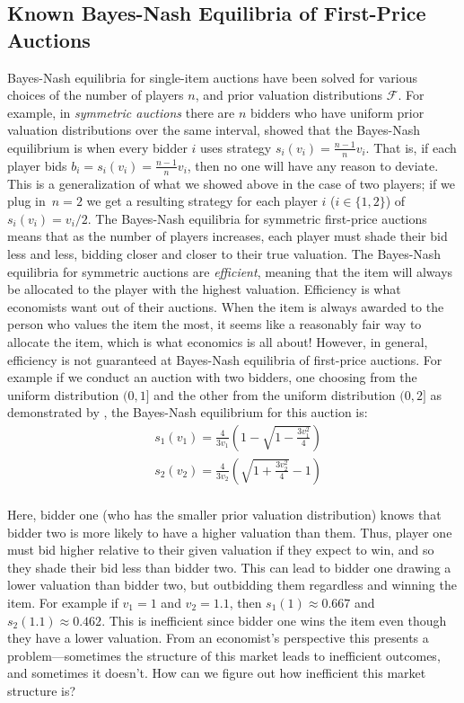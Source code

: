 \documentclass[12pt,twoside]{reedthesis}
\begin{document}
\subsection{Known Bayes-Nash Equilibria of First-Price Auctions}
Bayes-Nash equilibria for single-item auctions have been solved for various choices of the number of players $n$, and prior valuation distributions $\mathcal{F}$. For example, in {\em symmetric auctions} there are $n$ bidders who have uniform prior valuation distributions over the same interval, \cite{Chawla2013} showed that the Bayes-Nash equilibrium is when every bidder $i$ uses strategy $s_i(v_i) = \frac{n-1}{n} v_i$. That is, if each player bids $b_i = s_i(v_i) = \frac{n -1}{n} v_i$, then no one will have any reason to deviate. This is a generalization of what we showed above in the case of two players; if we plug in~$n=2$ we get a resulting strategy for each player $i$ ($i \in \{1,2\}$) of $s_i(v_i) = v_i/2$. The Bayes-Nash equilibria for symmetric first-price auctions means that as the number of players increases, each player must shade their bid less and less, bidding closer and closer to their true valuation. The Bayes-Nash equilibria for symmetric auctions are {\em efficient}, meaning that the item will always be allocated to the player with the highest valuation. Efficiency is what economists want out of their auctions. When the item is always awarded to the person who values the item the most, it seems like a reasonably fair way to allocate the item, which is what economics is all about! However, in general, efficiency is not guaranteed at Bayes-Nash equilibria of first-price auctions. For example if we conduct an auction with two bidders, one choosing from the uniform distribution $(0,1]$ and the other from the uniform distribution $(0,2]$ as demonstrated by \citet{Krishna2002}, the Bayes-Nash equilibrium for this auction is:
\begin{align*}
	&s_1(v_1) = \frac{4}{3 v_1} \left(1 - \sqrt{1 - \frac{3v_1^2}{4}}\right)\\
	&s_2(v_2) = \frac{4}{3 v_2} \left(\sqrt{1 + \frac{3v_2^2}{4}} - 1 \right)\\
\end{align*}

Here, bidder one (who has the smaller prior valuation distribution) knows that bidder two is more likely to have a higher valuation than them. Thus, player one must bid higher relative to their given valuation if they expect to win, and so they shade their bid less than bidder two. This can lead to bidder one drawing a lower valuation than bidder two, but outbidding them regardless and winning the item. For example if $v_1 = 1$ and $v_2 = 1.1$, then $s_1(1) \approx 0.667$ and $s_2(1.1) \approx 0.462$. This is inefficient since bidder one wins the item even though they have a lower valuation. From an economist's perspective this presents a problem---sometimes the structure of this market leads to inefficient outcomes, and sometimes it doesn't. How can we figure out how inefficient this market structure is?
\end{document}
